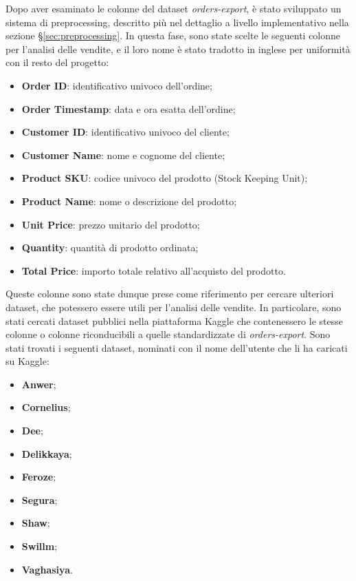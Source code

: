 Dopo aver esaminato le colonne del dataset \emph{orders-export}, è stato sviluppato un sistema di preprocessing, descritto più nel dettaglio a livello implementativo nella sezione \S\ref{sec:preprocessing}. In questa fase, sono state scelte le seguenti colonne per l'analisi delle vendite, e il loro nome è stato tradotto in inglese per uniformità con il resto del progetto:
\begin{itemize}
    \item \textbf{Order ID}: identificativo univoco dell'ordine;
    \item \textbf{Order Timestamp}: data e ora esatta dell'ordine;
    \item \textbf{Customer ID}: identificativo univoco del cliente;
    \item \textbf{Customer Name}: nome e cognome del cliente;
    \item \textbf{Product SKU}: codice univoco del prodotto (Stock Keeping Unit);
    \item \textbf{Product Name}: nome o descrizione del prodotto;
    \item \textbf{Unit Price}: prezzo unitario del prodotto;
    \item \textbf{Quantity}: quantità di prodotto ordinata;
    \item \textbf{Total Price}: importo totale relativo all'acquisto del prodotto.
\end{itemize}

Queste colonne sono state dunque prese come riferimento per cercare ulteriori dataset, che potessero essere utili per l'analisi delle vendite. In particolare, sono stati cercati dataset pubblici nella piattaforma Kaggle che contenessero le stesse colonne o colonne riconducibili a quelle standardizzate di \emph{orders-export}. Sono stati trovati i seguenti dataset, nominati con il nome dell'utente che li ha caricati su Kaggle:
\begin{itemize}
    \item \textbf{Anwer};
    \item \textbf{Cornelius};
    \item \textbf{Dee};
    \item \textbf{Delikkaya};
    \item \textbf{Feroze};
    \item \textbf{Segura};
    \item \textbf{Shaw};
    \item \textbf{Swillm};
    \item \textbf{Vaghasiya}.
\end{itemize}

